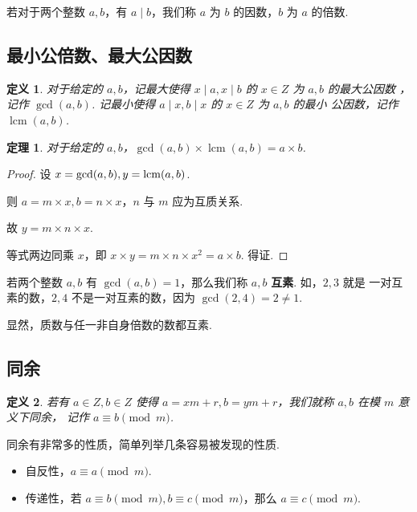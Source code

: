 \documentclass[a4paper]{article}
\newtheorem{theorem}{定理}[section]
\newtheorem{definition}{定义}[section]
\begin{document}
若对于两个整数 $a,b$，有 $a\mid b$，我们称 $a$ 为 $b$ 的因数，$b$ 为 $a$ 的倍数.

\subsection{最小公倍数、最大公因数}

\begin{definition}
    对于给定的 $a,b$，记最大使得 $x \mid a,x \mid b$ 的 $x\in Z$ 为 $a,b$ 的最大公因数
    ，记作 $\gcd(a,b)$. 记最小使得 $a\mid x,b\mid x$ 的 $x \in Z$ 为 $a,b$ 的最小
    公因数，记作 $\operatorname{lcm}(a,b)$.
\end{definition}

\begin{theorem}
    对于给定的 $a,b$，$\gcd(a,b)\times \operatorname{lcm}(a,b)=a\times b$.
\end{theorem}

\begin{proof}
    设 $x=\gcd(a,b),y=\operatornamewithlimits{lcm}(a,b)$.

    则 $a=m\times x,b=n\times x$，$n$ 与 $m$ 应为互质关系.

    故 $y=m\times n\times x$.

    等式两边同乘 $x$，即 $x\times y=m\times n\times x^2=a\times b$. 得证.
\end{proof}

若两个整数 $a,b$ 有 $\gcd(a,b)=1$，那么我们称 $a,b$ \textbf{互素}. 如，$2,3$ 就是
一对互素的数，$2,4$ 不是一对互素的数，因为 $\gcd(2,4)=2\ne 1$.

显然，质数与任一非自身倍数的数都互素.

\subsection{同余}

\begin{definition}
    若有 $a\in Z,b\in Z$ 使得 $a=xm+r,b=ym+r$，我们就称 $a,b$ 在模 $m$ 意义下同余，
    记作 $a\equiv b \pmod m$.
\end{definition}

同余有非常多的性质，简单列举几条容易被发现的性质.

\begin{itemize}
    \item 自反性，$a\equiv a\pmod m$.
    \item 传递性，若 $a\equiv b\pmod m,b\equiv c \pmod m$，那么
          $a\equiv c\pmod m$.
\end{itemize}
\end{document}

